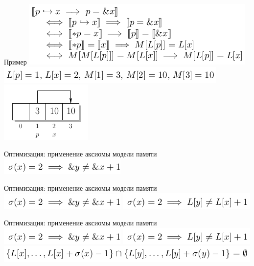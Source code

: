 \documentclass{beamer}
\begin{document}
\begin{frame}{Пример}
\includegraphics[scale=0.5]{ex_bad1.png}\newline
\includegraphics[scale=0.5]{ex_bad2.png}\newline
\includegraphics[scale=0.5]{ex_bad3.png}\newline
\end{frame}

\begin{frame}{Оптимизация: применение аксиомы модели памяти}
\includegraphics[scale=0.5]{meory1.png}\newline
\end{frame}

\begin{frame}{Оптимизация: применение аксиомы модели памяти}
\includegraphics[scale=0.5]{meory1.png}\newline
\includegraphics[scale=0.5]{meory2.png}\newline
\end{frame}

\begin{frame}{Оптимизация: применение аксиомы модели памяти}
\includegraphics[scale=0.5]{meory1.png}\newline
\includegraphics[scale=0.5]{meory2.png}\newline
\includegraphics[scale=0.5]{meory3.png}\newline
\end{frame}
\end{document}
